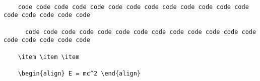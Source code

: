 \documentclass{article}
\begin{document}
    \begin{verbatim}

    code code code code code code code code code code code code code code code code code code

      code code code code code code code code code code code code code code code code code code

    \item \item \item

    \begin{align} E = mc^2 \end{align}

    \end{verbatim}
\end{document}
